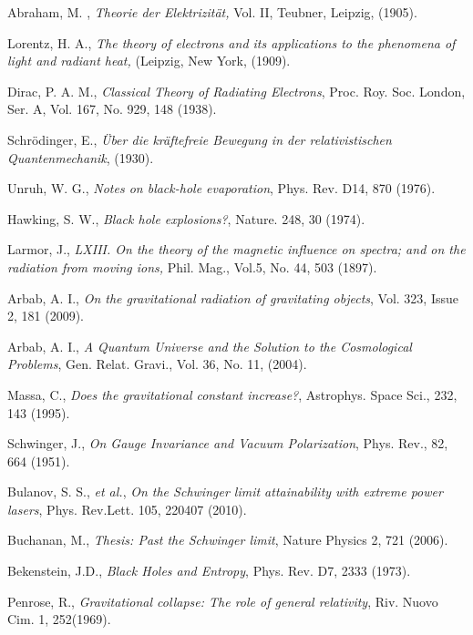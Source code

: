 \documentclass[12pt]{article}
\begin{document}
\begin{thebibliography}{}

Abraham, M. , \emph{Theorie der Elektrizit\"{a}t,} Vol. II, Teubner, Leipzig, (1905).

 Lorentz, H. A., \emph{The theory of electrons and its applications to the phenomena of light and radiant heat,} (Leipzig, New York, (1909).


Dirac, P. A. M., \emph{Classical Theory of Radiating Electrons}, Proc. Roy. Soc.  London,  Ser. A, Vol. 167, No. 929, 148 (1938).

Schrödinger, E.,  \emph{\"{U}ber die kräftefreie Bewegung in der relativistischen Quantenmechanik}, (1930).

 Unruh, W. G., \emph{Notes on black-hole evaporation}, Phys. Rev. D14,  870 (1976).


Hawking, S. W., \emph{Black hole explosions?}, Nature. 248, 30 (1974).

 Larmor, J., \emph{LXIII. On the theory of the magnetic influence on spectra; and on the radiation from moving ions,} Phil. Mag., Vol.5, No. 44, 503 (1897).


Arbab, A. I.,  \emph{On the gravitational radiation of gravitating objects},   Vol. 323, Issue 2, 181 (2009).

Arbab, A. I., \emph{A Quantum Universe and the Solution to the Cosmological Problems}, Gen. Relat. Gravi., Vol. 36, No. 11, (2004).

Massa, C., \emph{Does the gravitational constant increase?}, Astrophys. Space Sci., 232,  143 (1995).

 Schwinger, J., \emph{On Gauge Invariance and Vacuum Polarization}, Phys. Rev., 82,  664 (1951).



Bulanov, S. S.,  {\it et al.}, \emph{On the Schwinger limit attainability with extreme power lasers}, Phys. Rev.Lett. 105, 220407 (2010).

Buchanan, M., \emph{Thesis: Past the Schwinger limit}, Nature Physics 2, 721 (2006).

Bekenstein, J.D., \emph{Black Holes and Entropy}, Phys. Rev. D7, 2333 (1973).

Penrose, R., \emph{Gravitational collapse: The role of general relativity}, Riv. Nuovo Cim. 1,  252(1969).


\end{thebibliography}
\end{document}
